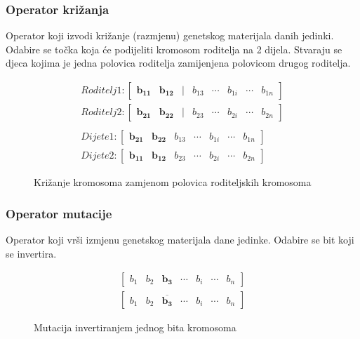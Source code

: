 \documentclass[times, utf8, zavrsni, numeric]{fer}
\begin{document}
\subsubsection{Operator križanja}
Operator koji izvodi križanje (razmjenu) genetskog materijala danih jedinki. Odabire se točka koja će podijeliti kromosom roditelja na 2 dijela. Stvaraju se djeca kojima je jedna polovica roditelja zamijenjena polovicom drugog roditelja.
\begin{figure}[htb]
\centering
\begin{align*}
Roditelj 1:
\begin{bmatrix}
\mathbf{b_{11}} & \mathbf{b_{12}} & | & b_{13} & \cdots & b_{1i} & \cdots & b_{1n}
\end{bmatrix} \\
Roditelj 2:
\begin{bmatrix}
\mathbf{b_{21}} & \mathbf{b_{22}} & | & b_{23} & \cdots & b_{2i} & \cdots & b_{2n}
\end{bmatrix} \\\\
Dijete 1:
\begin{bmatrix}
\mathbf{b_{21}} & \mathbf{b_{22}} & b_{13} & \cdots & b_{1i} & \cdots & b_{1n}
\end{bmatrix} \\
Dijete 2:
\begin{bmatrix}
\mathbf{b_{11}} & \mathbf{b_{12}} & b_{23} & \cdots & b_{2i} & \cdots & b_{2n}
\end{bmatrix}
\end{align*}
\caption{Križanje kromosoma zamjenom polovica roditeljskih kromosoma}
\end{figure}

\subsubsection{Operator mutacije}
Operator koji vrši izmjenu genetskog materijala dane jedinke. Odabire se bit koji se invertira.
\begin{figure}[htb]
\centering
\begin{align*}
\begin{bmatrix}
b_1 & b_2 & \mathbf{b_3} & \cdots & b_i & \cdots & b_n
\end{bmatrix}\\
\begin{bmatrix}
b_1 & b_2 & \overline{\mathbf{b_3}} & \cdots & b_i & \cdots & b_n
\end{bmatrix}
\end{align*}
\caption{Mutacija invertiranjem jednog bita kromosoma}
\end{figure}
\end{document}
